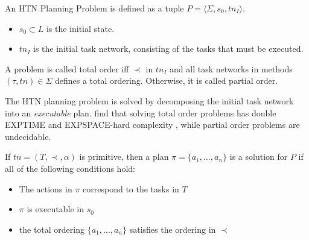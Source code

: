 \begin{definition}
  An \ac{HTN} Planning Problem is defined as a tuple $P=\langle \Sigma, s_0, tn_I \rangle$.
  \begin{itemize}
    \item $s_0 \subset L$ is the initial state.
    \item $tn_I$ is the initial task network, consisting of the tasks that must be executed.
  \end{itemize}
  A problem is called total order iff $\prec$ in $tn_I$ and all task networks in methods $(\tau,tn) \in \Sigma$ defines a total ordering.
  Otherwise, it is called partial order. 
\end{definition}



The \ac{HTN} planning problem is solved by decomposing the initial task network into an \textit{executable} plan.
\cite{erolHTNPlanningComplexity1994} find that solving total order problems has double EXPTIME and EXPSPACE-hard complexity \citep{papadimitriouComputationalComplexity2003}, while partial order problems are undecidable.

\begin{definition}
  If $tn = (T,\prec,\alpha)$ is \textnormal{primitive}, then a plan $\pi = \{a_1,\dots,a_n\}$ is a solution for $P$ if all of the following conditions hold:
  \begin{itemize}
    \item The actions in $\pi$ correspond to the tasks in $T$
    \item $\pi$ is \textnormal{executable} in $s_0$
    \item the total ordering $\{a_1,\dots,a_n\}$ satisfies the ordering in $\prec$
  \end{itemize}
  \label{def:htn-sol}
\end{definition}

